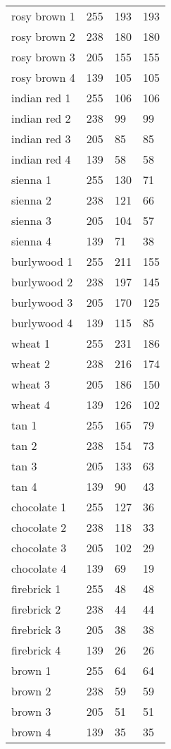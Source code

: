\begin{center}
\begin{tabular}{llll}
  rosy brown 1 & 255 & 193 & 193  \\
  rosy brown 2 & 238 & 180 & 180  \\
  rosy brown 3 & 205 & 155 & 155  \\
  rosy brown 4 & 139 & 105 & 105  \\
  indian red 1 & 255 & 106 & 106  \\
  indian red 2 & 238 & 99 & 99  \\
  indian red 3 & 205 & 85 & 85  \\
  indian red 4 & 139 & 58 & 58  \\
  sienna 1 & 255 & 130 & 71  \\
  sienna 2 & 238 & 121 & 66  \\
  sienna 3 & 205 & 104 & 57  \\
  sienna 4 & 139 & 71 & 38  \\
  burlywood 1 & 255 & 211 & 155  \\
  burlywood 2 & 238 & 197 & 145  \\
  burlywood 3 & 205 & 170 & 125  \\
  burlywood 4 & 139 & 115 & 85  \\
  wheat 1 & 255 & 231 & 186  \\
  wheat 2 & 238 & 216 & 174  \\
  wheat 3 & 205 & 186 & 150  \\
  wheat 4 & 139 & 126 & 102  \\
  tan 1 & 255 & 165 & 79  \\
  tan 2 & 238 & 154 & 73  \\
  tan 3 & 205 & 133 & 63  \\
  tan 4 & 139 & 90 & 43  \\
  chocolate 1 & 255 & 127 & 36  \\
  chocolate 2 & 238 & 118 & 33  \\
  chocolate 3 & 205 & 102 & 29  \\
  chocolate 4 & 139 & 69 & 19  \\
  firebrick 1 & 255 & 48 & 48  \\
  firebrick 2 & 238 & 44 & 44  \\
  firebrick 3 & 205 & 38 & 38  \\
  firebrick 4 & 139 & 26 & 26  \\
  brown 1 & 255 & 64 & 64  \\
  brown 2 & 238 & 59 & 59  \\
  brown 3 & 205 & 51 & 51  \\
  brown 4 & 139 & 35 & 35  \\

\end{tabular}
\end{center}
